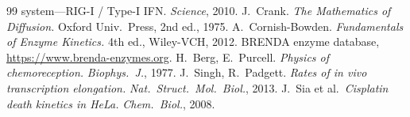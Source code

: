 \documentclass[11pt,letterpaper,twoside,openany]{book}
\begin{document}
\begin{thebibliography}{99}
{  system---RIG-I / Type-I IFN.} \emph{Science}, 2010.
 J.~Crank. \emph{The Mathematics of Diffusion.}
  Oxford Univ.\ Press, 2nd ed., 1975.
 A.~Cornish-Bowden. \emph{Fundamentals of Enzyme
  Kinetics.} 4th ed., Wiley-VCH, 2012.
 BRENDA enzyme database,
  \url{https://www.brenda-enzymes.org}.
 H.~Berg, E.~Purcell. \emph{Physics of chemoreception.}
  \emph{Biophys.\ J.}, 1977.
 J.~Singh, R.~Padgett. \emph{Rates of in vivo
  transcription elongation.} \emph{Nat.\ Struct.\ Mol.\ Biol.}, 2013.
 J.~Sia et al.\ \emph{Cisplatin death kinetics in HeLa.}
  \emph{Chem.\ Biol.}, 2008.
\end{thebibliography}

\printindex
\end{document}
